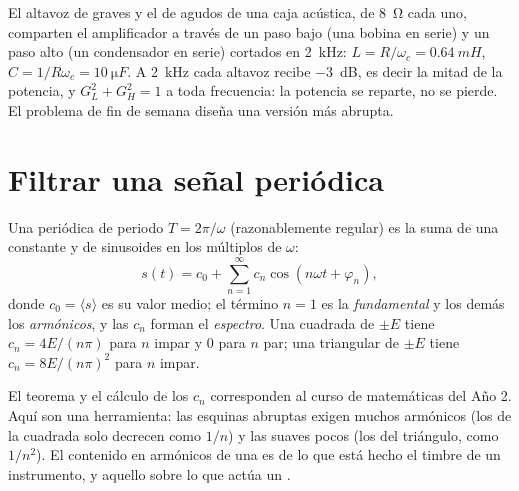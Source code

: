 \begin{example}\label{ex:b1:filters-transfer-functions:crossover}
El altavoz de graves y el de agudos de una caja acústica, de
\qty{8}{\ohm} cada uno, comparten el amplificador a través de un paso bajo
(una bobina en serie) y un paso alto (un condensador en serie) cortados en
\qty{2}{kHz}: $L = R/\omega_c = \qty{0.64}{mH}$,
$C = 1/R\omega_c = \qty{10}{\micro F}$. A \qty{2}{kHz} cada altavoz recibe
\qty{-3}{dB}, es decir la mitad de la potencia, y $G_L^2 + G_H^2 = 1$ a
toda frecuencia: la potencia se reparte, no se pierde. El problema de fin
de semana diseña una versión más abrupta.
\end{example}

\section{Filtrar una señal periódica}

\begin{theorem}\label{thm:b1:filters-transfer-functions:fourier}
Una  periódica de periodo $T = 2\pi/\omega$ (razonablemente regular)
es la suma de una constante y de sinusoides en los múltiplos de $\omega$:
\[
s(t) = c_0 + \sum_{n = 1}^{\infty} c_n\cos(n\omega t + \varphi_n),
\]
donde $c_0 = \langle s\rangle$ es su valor medio; el término $n = 1$ es la
\emph{fundamental} y los demás los \emph{armónicos}, y las 
$c_n$ forman el \emph{espectro}. Una  cuadrada de  $\pm E$
tiene $c_n = 4E/(n\pi)$ para $n$ impar y $0$ para $n$ par; una 
triangular de  $\pm E$ tiene $c_n = 8E/(n\pi)^2$ para $n$ impar.
\end{theorem}
\admitted

\begin{remark}\label{rem:b1:filters-transfer-functions:fourier}
El teorema y el cálculo de los $c_n$ corresponden al curso de matemáticas
del Año 2. Aquí son una herramienta: las esquinas abruptas exigen muchos
armónicos (los de la  cuadrada solo decrecen como $1/n$) y las
 suaves pocos (los del triángulo, como $1/n^2$). El contenido en
armónicos de una  es de lo que está hecho el timbre de un
instrumento, y aquello sobre lo que actúa un .
\end{remark}

